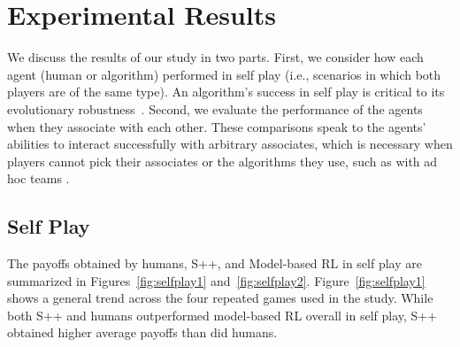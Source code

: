 \documentclass[fleqn,10pt]{SelfArx}
\begin{document}
\section{Experimental Results}
We discuss the results of our study in two parts.  First, we consider how each agent (human or algorithm) performed in self play (i.e., scenarios in which both players are of the same type).  An algorithm's success in self play is critical to its evolutionary robustness~\cite{Axelrod:1984}.  Second, we evaluate the performance of the agents when they associate with each other.  These comparisons speak to the agents' abilities to interact successfully with arbitrary associates, which is necessary when players cannot pick their associates or the algorithms they use, such as with ad hoc teams \cite{StoneAdHoc}.

\subsection{Self Play}
The payoffs obtained by humans, S++, and Model-based RL in self play are summarized in Figures~\ref{fig:selfplay1} and~\ref{fig:selfplay2}.  Figure~\ref{fig:selfplay1} shows a general trend across the four repeated games used in the study.  While both S++ and humans outperformed model-based RL overall in self play, S++ obtained higher average payoffs than did humans.


\begin{figure*}
\centering
	\\ \vspace{-.15in}
\caption{Average payoffs of both players over time in self play in each game.}
\label{fig:selfplay2}
\end{figure*}
\end{document}
